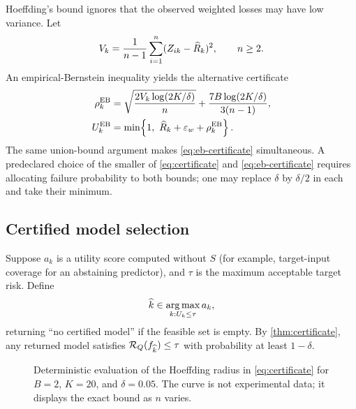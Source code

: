 Hoeffding's bound ignores that the observed weighted losses may have low variance.
Let
\[
  V_k=\frac{1}{n-1}\sum_{i=1}^{n}(Z_{ik}-\widehat R_k)^2,
  \qquad n\geq2.
\]
An empirical-Bernstein inequality \citep{maurer2009empirical} yields the alternative
certificate
\begin{align}
  \rho_k^{\mathrm{EB}}
  &=\sqrt{\frac{2V_k\log(2K/\delta)}{n}}
    +\frac{7B\log(2K/\delta)}{3(n-1)}, \nonumber\\
  U_k^{\mathrm{EB}}
  &=\min\!\left\{1,\ \widehat R_k+\varepsilon_w+\rho_k^{\mathrm{EB}}\right\}.
  \label{eq:eb-certificate}
\end{align}
The same union-bound argument makes \cref{eq:eb-certificate} simultaneous.  A
predeclared choice of the smaller of \cref{eq:certificate} and
\cref{eq:eb-certificate} requires allocating failure probability to both bounds;
one may replace $\delta$ by $\delta/2$ in each and take their minimum.

\subsection{Certified model selection}

Suppose $a_k$ is a utility score computed without $S$ (for example, target-input
coverage for an abstaining predictor), and $\tau$ is the maximum acceptable target
risk.  Define
\begin{equation}
  \widehat k\in\operatorname*{arg\,max}_{k:U_k\leq\tau}a_k,
  \label{eq:selection}
\end{equation}
returning ``no certified model'' if the feasible set is empty.  By
\cref{thm:certificate}, any returned model satisfies
$\mathcal{R}_Q(f_{\widehat k})\leq\tau$ with probability at least $1-\delta$.

\begin{figure}[t]
\centering
{}
\caption{Deterministic evaluation of the Hoeffding radius in
\cref{eq:certificate} for $B=2$, $K=20$, and $\delta=0.05$.  The curve is not
experimental data; it displays the exact bound as $n$ varies.}
\label{fig:radius}
\end{figure}

